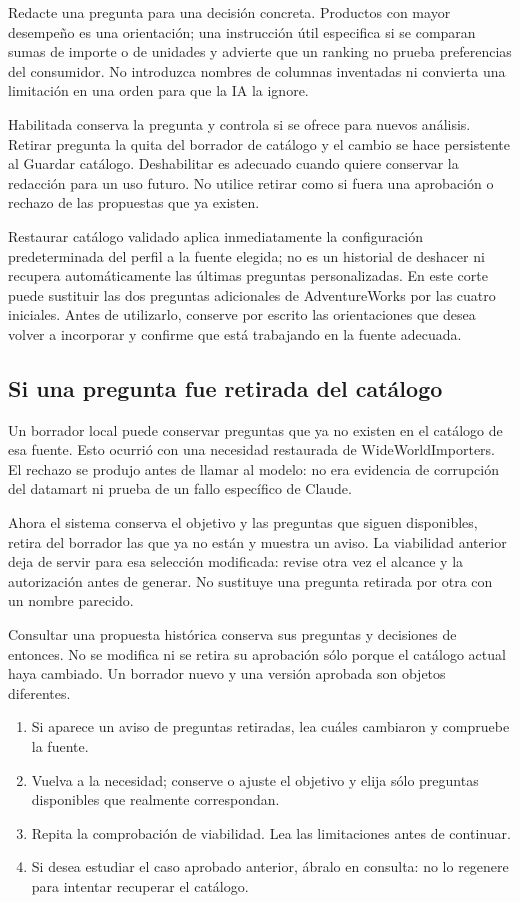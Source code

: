 Redacte una pregunta para una decisión concreta. Productos con mayor desempeño es una orientación; una instrucción útil especifica si se comparan sumas de importe o de unidades y advierte que un ranking no prueba preferencias del consumidor. No introduzca nombres de columnas inventadas ni convierta una limitación en una orden para que la IA la ignore.

Habilitada conserva la pregunta y controla si se ofrece para nuevos análisis. Retirar pregunta la quita del borrador de catálogo y el cambio se hace persistente al Guardar catálogo. Deshabilitar es adecuado cuando quiere conservar la redacción para un uso futuro. No utilice retirar como si fuera una aprobación o rechazo de las propuestas que ya existen.

Restaurar catálogo validado aplica inmediatamente la configuración predeterminada del perfil a la fuente elegida; no es un historial de deshacer ni recupera automáticamente las últimas preguntas personalizadas. En este corte puede sustituir las dos preguntas adicionales de AdventureWorks por las cuatro iniciales. Antes de utilizarlo, conserve por escrito las orientaciones que desea volver a incorporar y confirme que está trabajando en la fuente adecuada.

\subsection{Si una pregunta fue retirada del catálogo}
Un borrador local puede conservar preguntas que ya no existen en el catálogo de esa fuente. Esto ocurrió con una necesidad restaurada de WideWorldImporters. El rechazo se produjo antes de llamar al modelo: no era evidencia de corrupción del datamart ni prueba de un fallo específico de Claude.

Ahora el sistema conserva el objetivo y las preguntas que siguen disponibles, retira del borrador las que ya no están y muestra un aviso. La viabilidad anterior deja de servir para esa selección modificada: revise otra vez el alcance y la autorización antes de generar. No sustituye una pregunta retirada por otra con un nombre parecido.

Consultar una propuesta histórica conserva sus preguntas y decisiones de entonces. No se modifica ni se retira su aprobación sólo porque el catálogo actual haya cambiado. Un borrador nuevo y una versión aprobada son objetos diferentes.

\begin{enumerate}
\item Si aparece un aviso de preguntas retiradas, lea cuáles cambiaron y compruebe la fuente.
\item Vuelva a la necesidad; conserve o ajuste el objetivo y elija sólo preguntas disponibles que realmente correspondan.
\item Repita la comprobación de viabilidad. Lea las limitaciones antes de continuar.
\item Si desea estudiar el caso aprobado anterior, ábralo en consulta: no lo regenere para intentar recuperar el catálogo.
\end{enumerate}

